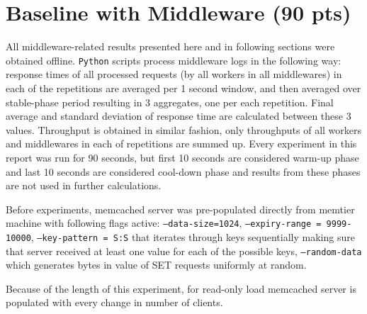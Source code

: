\documentclass[11pt,a4paper]{article}
\begin{document}

\section{Baseline with Middleware (90 pts)}

All middleware-related results presented here and in following sections were obtained offline. \texttt{Python} scripts process middleware logs in the following way: response times of all processed requests (by all workers in all middlewares) in each of the repetitions are averaged per 1 second window, and then averaged over stable-phase period resulting in 3 aggregates, one per each repetition. Final average and standard deviation of response time are calculated between these 3 values. Throughput is obtained in similar fashion, only throughputs of all workers and middlewares in each of repetitions are summed up. Every experiment in this report was run for 90 seconds, but first 10 seconds are considered warm-up phase and last 10 seconds are considered cool-down phase and results from these phases are not used in further calculations.

Before experiments, memcached server was pre-populated directly from memtier machine with following flags active: \texttt{--data-size=1024}, \texttt{--expiry-range = 9999-10000}, \texttt{--key-pattern = S:S} that iterates through keys sequentially making sure that server received at least one value for each of the possible keys, \texttt{--random-data} which generates bytes in value of SET requests uniformly at random. 

Because of the length of this experiment, for read-only load memcached server is populated with every change in number of clients.

\end{document}
